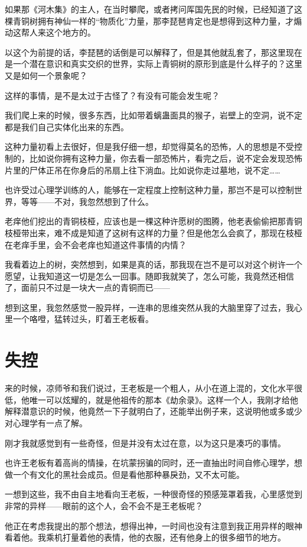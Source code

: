 如果那《河木集》的主人，在当时攀爬，或者拷问厍国先民的时候，已经知道了这棵青铜树拥有神仙一样的“物质化”力量，那李琵琶肯定也是想得到这种力量，才煽动这帮人来这个地方的。

以这个为前提的话，李琵琶的话倒是可以解释了，但是其他就乱套了，那这里现在是一个潜在意识和真实交织的世界，实际上青铜树的原形到底是什么样子的？这里又是如何一个景象呢？

这样的事情，是不是太过于古怪了？有没有可能会发生呢？

我们爬上来的时候，很多东西，比如带着螭蛊面具的猴子，岩壁上的空洞，说不定都是我们自己实体化出来的东西。

这种力量初看上去很好，但是我仔细一想，却觉得莫名的恐怖，人的思想是不受控制的，比如说你拥有这种力量，你去看一部恐怖片，看完之后，说不定会发现恐怖片里的尸体正吊在你身后的吊扇上往下淌血。比如说你走过墓地，说不定……

也许受过心理学训练的人，能够在一定程度上控制这种力量，那岂不是可以控制世界，等等——不对，我忽然想到了什么。

老痒他们挖出的青铜枝桠，应该也是一棵这种许愿树的图腾，他老表偷偷把那青铜枝桠带出来，难不成是知道了这树有这样的力量？但是他怎么会疯了，那现在枝桠在老痒手里，会不会老痒也知道这件事情的内情？

我看着边上的树，突然想到，如果是真的话，那我现在岂不是可以对这个树许一个愿望，让我知道这一切是怎么一回事。随即我就笑了，怎么可能，我竟然还相信了，面前只不过是一块大一点的青铜而已——

想到这里，我忽然感觉一股异样，一连串的思维突然从我的大脑里穿了过去，我心里一个咯噔，猛转过头，盯着王老板看。

\chapter{失控}

来的时候，凉师爷和我们说过，王老板是一个粗人，从小在道上混的，文化水平很低，他唯一可以炫耀的，就是他祖传的那本《劫余录》。这样一个人，我刚才给他解释潜意识的时候，他竟然一下子就明白了，还能举出例子来，这说明他或多或少对心理学有一点了解。

刚才我就感觉到有一些奇怪，但是并没有太过在意，以为这只是凑巧的事情。

也许王老板有着高尚的情操，在坑蒙拐骗的同时，还一直抽出时间自修心理学，想做一个有文化的黑社会成员。但是看他那种暴戾劲，又不太可能。

一想到这些，我不由自主地看向王老板，一种很奇怪的预感笼罩着我，心里感觉到非常的异样——眼前的这个人，会不会不是王老板呢？

他正在考虑我提出的那个想法，想得出神，一时间也没有注意到我正用异样的眼神看着他。我乘机打量着他的表情，他的衣服，还有他身上的很多细节的地方。


